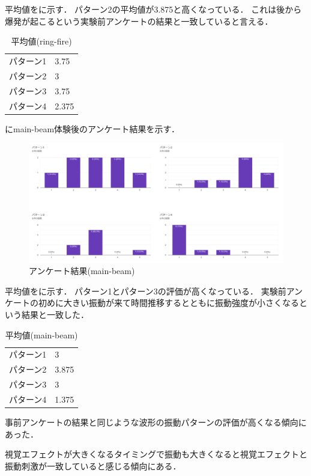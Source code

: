 平均値をに示す．
パターン2の平均値が3.875と高くなっている．
これは後から爆発が起こるという実験前アンケートの結果と一致していると言える．

\begin{table}[h]
    \caption{平均値(ring-fire)}
    \centering
    \begin{tabular}{l|l}
    \hline
    \hline
    パターン1 & 3.75\\
    パターン2 & 3\\
    パターン3 & 3.75\\
    パターン4 & 2.375\\
    \hline
    \end{tabular}
    \label{tab;ringAve}
\end{table}

にmain-beam体験後のアンケート結果を示す．

\begin{figure}[h]
  \centering
  \includegraphics[clip,width=15cm]{fig/mainbeamAnk.png}
  \caption{アンケート結果(main-beam)}\label{mainAnk}
  \end{figure}


平均値をに示す．
パターン1とパターン3の評価が高くなっている．
実験前アンケートの初めに大きい振動が来て時間推移するとともに振動強度が小さくなるという結果と一致した．

  \begin{table}[H]
    \caption{平均値(main-beam)}
    \centering
    \begin{tabular}{l|l}
    \hline
    \hline
    パターン1 & 3\\
    パターン2 & 3.875\\
    パターン3 & 3\\
    パターン4 & 1.375\\
    \hline
    \end{tabular}
    \label{tab;mainAve}
\end{table}

\newpage

事前アンケートの結果と同じような波形の振動パターンの評価が高くなる傾向にあった．

視覚エフェクトが大きくなるタイミングで振動も大きくなると視覚エフェクトと振動刺激が一致していると感じる傾向にある．


